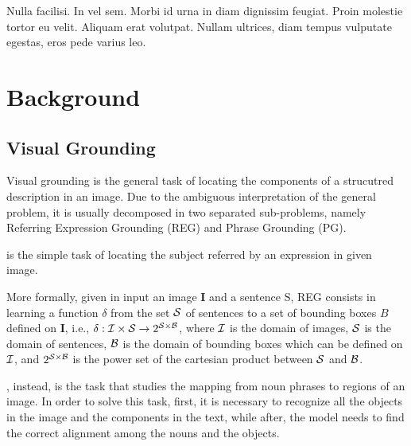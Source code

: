 
\begin{savequote}[75mm]
Nulla facilisi. In vel sem. Morbi id urna in diam dignissim feugiat. Proin molestie tortor eu velit. Aliquam erat volutpat. Nullam ultrices, diam tempus vulputate egestas, eros pede varius leo.
\end{savequote}

\chapter{Background}
\label{ch:background}

\section{Visual Grounding}
\label{sec:visual-grounding}

Visual grounding is the general task of locating the components of a
strucutred description in an image. Due to the ambiguous
interpretation of the general problem, it is usually decomposed in two
separated sub-problems, namely Referring Expression Grounding (REG)
and Phrase Grounding (PG).

 is the simple task of
locating the subject referred by an expression in given image.

More formally, given in input an image $\bm{I}$ and a sentence
$\mathrm{S}$, REG consists in learning a function $\delta$ from the
set $\mathcal{S}$ of sentences to a set of bounding boxes $B$ defined on
$\bm{I}$, i.e., $\delta: \mathcal{I} \times \mathcal{S} \rightarrow 2^{\mathcal{S}
\times \mathcal{B}}$, where $\mathcal{I}$ is the domain of images, $\mathcal{S}$ is the
domain of sentences, $\mathcal{B}$ is the domain of bounding boxes which can
be defined on $\mathcal{I}$, and $2^{\mathcal{S} \times \mathcal{B}}$ is the power set
of the cartesian product between $\mathcal{S}$ and $\mathcal{B}$.

, instead, is the task that studies the
mapping from noun phrases to regions of an image. In order to solve
this task, first, it is necessary to recognize all the objects in the
image and the components in the text, while after, the model needs to
find the correct alignment among the nouns and the objects.

